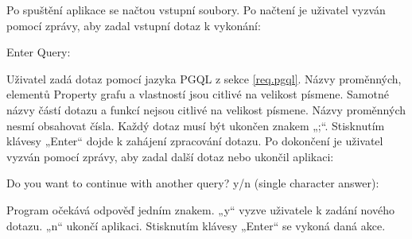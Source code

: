 Po spuštění aplikace se načtou vstupní soubory.
Po načtení je uživatel vyzván pomocí zprávy, aby zadal vstupní dotaz k vykonání:
\begin{code}
Enter Query:
\end{code}
Uživatel zadá dotaz pomocí jazyka PGQL z sekce \ref{req.pgql}.
Názvy proměnných, elementů Property grafu a vlastností jsou citlivé na velikost písmene.
Samotné názvy částí dotazu a funkcí nejsou citlivé na velikost písmene.
Názvy proměnných nesmí obsahovat čísla.
Každý dotaz musí být ukončen znakem „;“.
Stisknutím klávesy „Enter“ dojde k zahájení zpracování dotazu.
Po dokončení je uživatel vyzván pomocí zprávy, aby zadal další dotaz nebo ukončil aplikaci:
\begin{code}
Do you want to continue with another query?
    y/n (single character answer):
\end{code}
Program očekává odpověď jedním znakem.
„y“ vyzve uživatele k zadání nového dotazu.
„n“ ukončí aplikaci.
Stisknutím klávesy „Enter“ se vykoná daná akce.